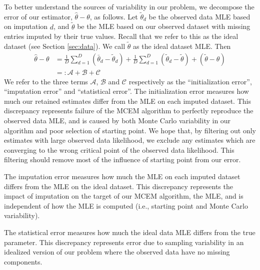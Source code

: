 \documentclass[11pt, oneside]{article}   	%
\begin{document}
To better understand the sources of variability in our problem, we decompose the error of our estimator, $\hat{\theta} - \theta$, as follows. Let $\tilde{\theta}_d$ be the observed data MLE based on imputation $d$, and $\tilde{\theta}$ be the MLE based on our observed dataset with missing entries imputed by their true values. Recall that we refer to this as the ideal dataset (see Section \ref{sec:data}). We call  $\tilde{\theta}$ as the ideal dataset MLE. Then
%
\begin{align}
	\hat{\theta} - \theta &= \frac{1}{D} \sum_{d=1}^D (\bar{\theta}_d - \tilde{\theta}_d) + \frac{1}{D} \sum_{d=1}^D (\tilde{\theta}_d - \tilde{\theta}) + (\tilde{\theta} - \theta) \label{eq:error_decomp}\\
	&=: \mathcal{A} + \mathcal{B} + \mathcal{C}
\end{align}
%
We refer to the three terms $\mathcal{A}$, $\mathcal{B}$ and $\mathcal{C}$ respectively as the ``initialization error'', ``imputation error'' and ``statistical error''. The initialization error measures how much our retained estimates differ from the MLE on each imputed dataset. This discrepancy represents failure of the MCEM algorithm to perfectly reproduce the observed data MLE, and is caused by both Monte Carlo variability in our algorithm and poor selection of starting point. We hope that, by filtering out only estimates with large observed data likelihood, we exclude any estimates which are converging to the wrong critical point of the observed data likelihood. This filtering should remove most of the influence of starting point from our error. 

The imputation error measures how much the MLE on each imputed dataset differs from the MLE on the ideal dataset. This discrepancy represents the impact of imputation on the target of our MCEM algorithm, the MLE, and is independent of how the MLE is computed (i.e., starting point and Monte Carlo variability). 

The statistical error measures how much the ideal data MLE differs from the true parameter. This discrepancy represents error due to sampling variability in an idealized version of our problem where the observed data have no missing components. 
\end{document}

